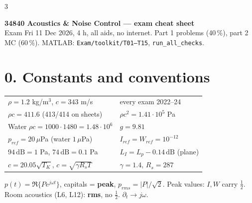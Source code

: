 \documentclass[10pt]{article}
\newcommand{\dB}{\,\mathrm{dB}}
\begin{document}
\small
\begin{multicols*}{3}

{\color{sec}\bfseries\large 34840 Acoustics \& Noise Control --- exam cheat sheet}\\
{\scriptsize Exam Fri 11 Dec 2026, 4 h, all aids, no internet. Part 1 problems (40\,\%), part 2 MC (60\,\%). MATLAB: \texttt{Exam/toolkit/T01--T15}, \texttt{run\_all\_checks}.}

\section{0. Constants and conventions}
\begin{tabular}{@{}ll@{}}
$\rho=1.2$ kg/m$^3$, $c=343$ m/s & every exam 2022--24 \\
$\rho c=411.6$ (413/414 on sheets) & $\rho c^2=1.41\cdot10^5$ Pa \\
Water $\rho c=1000\cdot1480=1.48\cdot10^6$ & $g=9.81$ \\
$p_{ref}=20\,\mu$Pa (water $1\,\mu$Pa) & $I_{ref}=W_{ref}=10^{-12}$ \\
$94\dB=1$ Pa, $74\dB=0.1$ Pa & $L_I=L_p-0.14\dB$ (plane) \\
$c=20.05\sqrt{T_K}$, $c=\sqrt{\gamma R_sT}$ & $\gamma=1.4$, $R_s=287$ \\
\end{tabular}

$p(t)=\Re\{Pe^{j\omega t}\}$, capitals = \textbf{peak}, $p_{rms}=|P|/\sqrt2$. Peak values: $I,W$ carry $\tfrac12$. Room acoustics (L6, L12): \textbf{rms}, no $\tfrac12$. $\partial_t\to j\omega$.


\end{multicols*}
\end{document}
